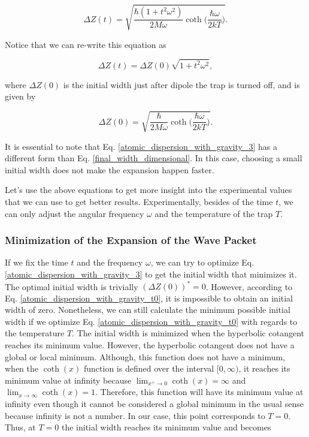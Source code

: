 \documentclass{article}
\begin{document}
\begin{equation}\label{atomic_dispersion_with_gravity_2}
    \Delta Z (t) = \sqrt{\frac{\hbar (1+t^{2} \omega^{2})}{2 M \omega} \coth \bigg(\frac{\hbar \omega}{2 kT} \bigg)}.
\end{equation}

Notice that we can re-write this equation as

\begin{equation}\label{atomic_dispersion_with_gravity_3}
    \Delta Z (t) = \Delta Z(0) \sqrt{1+t^{2}\omega^{2}},
\end{equation}

where $\Delta Z(0)$ is the initial width just after dipole the trap is turned off, and is given by

\begin{equation}\label{atomic_dispersion_with_gravity_t0}
    \Delta Z(0) = \sqrt{\frac{\hbar}{2M \omega} \coth \bigg(\frac{\hbar \omega}{2kT} \bigg)}.
\end{equation}

It is essential to note that Eq. \ref{atomic_dispersion_with_gravity_3} has a different form than Eq. \ref{final_width_dimensional}. In this case, choosing a small initial width does not make the expansion happen faster.

Let's use the above equations to get more insight into the experimental values that we can use to get better results. Experimentally, besides of the time $t$, we can only adjust the angular frequency $\omega$ and the temperature of the trap $T$.

\subsubsection{Minimization of the Expansion of the Wave Packet}
If we fix the time $t$ and the frequency $\omega$, we can try to optimize Eq. \ref{atomic_dispersion_with_gravity_3} to get the initial width that minimizes it. The optimal initial width is trivially $(\Delta Z(0))^{*}=0$. However, according to Eq. \ref{atomic_dispersion_with_gravity_t0}, it is impossible to obtain an initial width of zero. Nonetheless, we can still calculate the minimum possible initial width if we optimize Eq. \ref{atomic_dispersion_with_gravity_t0} with regards to the temperature $T$. The initial width is minimized when the hyperbolic cotangent reaches its minimum value. However, the hyperbolic cotangent does not have a global or local minimum. Although, this function does not have a minimum, when the $\coth(x)$ function is defined over the interval $[0,\infty)$, it reaches its minimum value at infinity because $\lim_{x^{+} \to 0} \coth(x)=\infty$ and $\lim_{x \to \infty} \coth(x)=1$. Therefore, this function will have its minimum value at infinity even though it cannot be considered a global minimum in the usual sense because infinity is not a number. In our case, this point corresponds to $T= 0$. Thus, at $T=0$ the initial width reaches its minimum value and becomes
\end{document}
